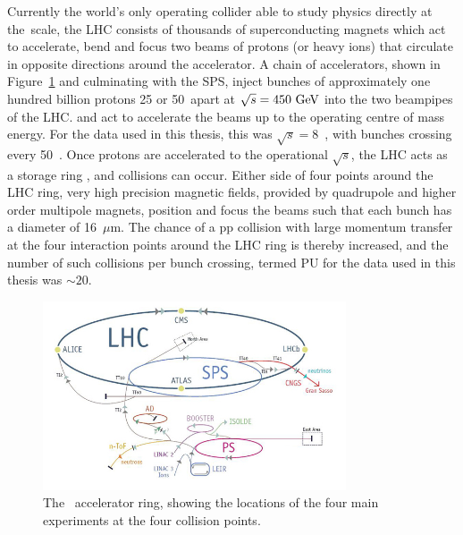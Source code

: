 Currently the world's only operating collider able to study physics directly at the~\TeV scale, the \ac{LHC} consists of thousands of superconducting magnets which act to accelerate, bend and focus two beams of protons (or heavy ions) that circulate in opposite directions around the accelerator. 
A chain of accelerators, shown in Figure~\ref{fig:LHC} and culminating with the \ac{SPS}, inject bunches of approximately one hundred billion protons 25 or 50~\ns apart at $\sqrt{s} = 450~\mathrm{GeV}$ into the two beampipes of the \ac{LHC}.
 and act to accelerate the beams up to the operating centre of mass energy. 
For the data used in this thesis, this was $\sqrt{s} = 8$~\TeV, 
with bunches crossing every 50~\ns.
Once protons are accelerated to the operational $\sqrt{s}$, the \ac{LHC} acts as a storage ring , and collisions can occur.
%
Either side of four points around the \ac{LHC} ring, very high precision magnetic fields, provided by quadrupole and higher order multipole magnets, position and focus the beams such that each bunch has a diameter of 16~$\mu$m. 
The chance of a pp collision with large momentum transfer at the four interaction points around the LHC ring is thereby increased, and the number of such collisions per bunch crossing, termed \ac{PU} for the data used in this thesis was $\sim20$.

\begin{figure}[htbp]
  \begin{center}
  \includegraphics[width=0.8\textwidth]{Figures/detector/lhc}
  \caption{The ~\LHC accelerator ring, showing the locations of the four main experiments at the four collision points.
}
  \label{fig:LHC}
  \end{center}
\end{figure}

